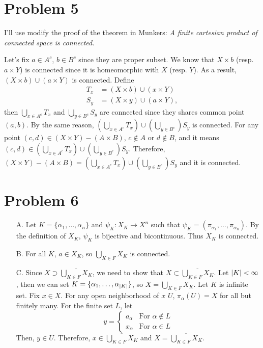 \documentclass{article}
\DeclarePairedDelimiter\abs{\lvert}{\rvert}%
\begin{document}
\section*{Problem 5}
I'll use modify the proof of the theorem in Munkers: \textit{A finite cartesian product of connected space is connected.}

Let's fix $a\in A^c$, $b\in B^c$ since they are proper subset. We know that $X\times b$ (resp. $a\times Y$) is connected since it is homeomorphic with $X$ (resp. $Y$). As a result, $(X\times b) \cup (a\times Y)$ is connected. Define
\begin{equation*}
\begin{split}
T_x&=(X\times b)\cup (x\times Y) \\
S_y&=(X\times y)\cup (a\times Y),
\end{split}
\end{equation*}
then $\bigcup_{x\in A^c} T_x$ and $\bigcup_{y\in B^c} S_y$ are connected since they shares common point $(a,b)$. By the same reason, $\left(\bigcup_{x\in A^c} T_x\right) \cup \left(\bigcup_{y\in B^c}\right)S_y$ is connected. For any point $(c,d)\in (X\times Y)-(A\times B)$, $c\notin A$ or $d\notin B$, and it means $(c,d)\in \left(\bigcup_{x\in A^c} T_x\right) \cup \left(\bigcup_{y\in B^c}\right)S_y$. Therefore, $(X\times Y)-(A\times B)=\left(\bigcup_{x\in A^c} T_x\right) \cup \left(\bigcup_{y\in B^c}\right)S_y$ and it is connected.
\section*{Problem 6}
\begin{enumerate}
\item[A.] Let $K=\{\alpha_1, \ldots, \alpha_n\}$ and $\psi_K:X_K\rightarrow X^{n}$ such that $\psi_K=(\pi_{\alpha_1}, \ldots, \pi_{\alpha_n})$. By the definition of $X_K$, $\psi_K$ is bijective and bicontinuous. Thus $X_K$ is connected.
\item[B.] For all $K$, $a\in X_K$, so $\bigcup_{K\in F}X_K$ is connected.
\item[C.] Since $X\supset\overline{\bigcup_{K\in F}X_K}$, we need to show that $X\subset \overline{\bigcup_{K\in F}X_K}$. Let $\abs{K}<\infty$, then we can set $K=\{\alpha_1, \ldots, \alpha_{\abs{K}}\}$, so $X=\overline{\bigcup_{K\in F}X_K}$. Let $K$ is infinite set. Fix $x\in X$. For any open neighborhood of $x$ $U$, $\pi_{\alpha}(U)=X$ for all but finitely many. For the finite set $L$, let
\begin{equation*}
y=\begin{cases}
a_{\alpha} & \text{For }\alpha\notin L \\
x_{\alpha} & \text{For }\alpha\in L
\end{cases}
\end{equation*}
Then, $y\in U$. Therefore, $x\in \overline{\bigcup_{K\in F}X_K}$ and $X=\overline{\bigcup_{K\in F}X_K}$.
\end{enumerate}
\end{document}
